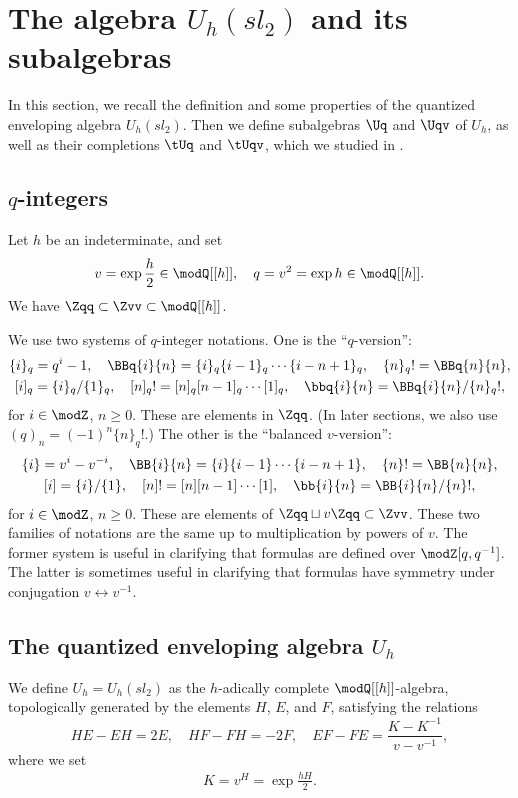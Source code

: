 \documentclass{amsart}
\numberwithin{equation}{section}
\numberwithin{figure}{section}
\theoremstyle{plain}
\theoremstyle{definition}
\theoremstyle{remark}
\begin{document}
\section{The algebra $U_h(sl_2)$ and its subalgebras}
\label{sec2}

In this section, we recall the definition and some properties of the
quantized enveloping algebra $U_h(sl_2)$.  Then we define subalgebras
$\Uq$ and $\Uqv$ of $U_h$, as well as their completions $\tUq$ and
$\tUqv$, which we studied in \cite{H:uqsl2}.

\subsection{$q$-integers}
\label{sec:q-integers}
Let $h$ be an indeterminate, and set
\begin{gather*}
  v=\exp\frac h2\in \modQ [[h]],\quad
  q=v^2=\exp h\in \modQ [[h]].
\end{gather*}
We have $\Zqq\subset \Zvv\subset \modQ [[h]]$.

We use two systems of $q$-integer notations.  One is the
``$q$-version'':
\begin{gather*}
  \{i\}_q = q^i-1,\quad
  \BBq{i}{n} = \{i\}_q\{i-1\}_q\cdots\{i-n+1\}_q,\quad
  \{n\}_q! =\BBq{n}{n},\\
  [i]_q=\{i\}_q/\{1\}_q,\quad
  [n]_q! = [n]_q[n-1]_q\cdots[1]_q,\quad
  \bbq{i}{n} = \BBq{i}{n}/\{n\}_q!,
\end{gather*}
for $i\in \modZ $, $n\ge 0$.  These are elements in $\Zqq$.  (In later
sections, we also use $(q)_n=(-1)^n\{n\}_q!$.)  The other is the
``balanced $v$-version'':
\begin{gather*}
  \{i\} = v^i-v^{-i},\quad
  \BB{i}{n} = \{i\}\{i-1\}\cdots\{i-n+1\},\quad
  \{n\}!=\BB{n}{n},\\
  [i]=\{i\}/\{1\},\quad
  [n]! = [n][n-1]\cdots[1],\quad
  \bb{i}{n} = \BB{i}{n}/\{n\}!,
\end{gather*}
for $i\in \modZ $, $n\ge 0$.  These are elements of $\Zqq\sqcup v\Zqq\subset \Zvv$.
These two families of notations are the same up to multiplication by
powers of $v$.  The former system is useful in clarifying that
formulas are defined over $\modZ [q,q^{-1}]$.  The latter is sometimes
useful in clarifying that formulas have symmetry under conjugation
$v\leftrightarrow v^{-1}$.

\subsection{The quantized enveloping algebra $U_h$}
\label{sec:quantized-enveloping-algebra}
We define $U_h=U_h(sl_2)$ as the $h$-adically complete
$\modQ [[h]]$-algebra, topologically generated by the elements $H$, $E$,
and $F$, satisfying the relations
\begin{equation*}
  HE-EH=2E,\quad HF-FH=-2F,\quad
  EF-FE=
  \frac{K-K^{-1}}{v-v^{-1}},
\end{equation*}
where we set
\begin{gather*}
  K= v^H = \exp\frac{hH}2.
\end{gather*}
\end{document}
